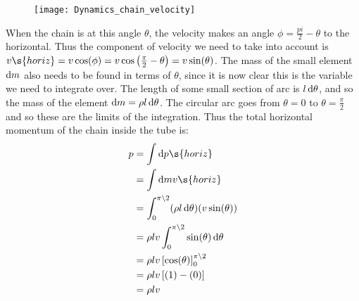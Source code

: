 \begin{hint}
{\begin{enumerate}
\begin{figure}[h]
\centering
\texttt{[image: Dynamics\_chain\_velocity]}
\caption{}
\label{fig:Dynamics_chain_velocity}
\end{figure}

When the chain is at this angle $\theta$, the velocity makes an angle $\phi = \frac{pi}{2} - \theta$ to the horizontal. Thus the component of velocity we need to take into account is $v\s{horiz} = v \cos(\phi) = v \cos\left(\frac{\pi}{2} - \theta\right) = v \sin(\theta)$. The mass of the small element $\operatorname{d}\! m$ also needs to be found in terms of $\theta$, since it is now clear this is the variable we need to integrate over. The length of some small section of arc is $l \operatorname{d}\! \theta$, and so the mass of the element $\operatorname{d}\! m = \rho l \operatorname{d}\!\theta$. The circular arc goes from $\theta = 0$ to $\theta =  \frac{\pi}{2}$ and so these are the limits of the integration. Thus the total horizontal momentum of the chain inside the tube is:
\begin{align*} p &= \int \d p\s{horiz} \\ &= \int \d m v\s{horiz} \\ &= \int_{0}^{\pi\backslash 2} (\rho l \d\theta)(v \sin(\theta)) \\ &= \rho l v \int_{0}^{\pi \backslash 2} \sin(\theta) \d\theta \\ &= \rho l v \left[ \cos(\theta)\right]_{0}^{\pi \backslash 2} \\ &= \rho l v \left[ (1) - (0) \right] \\ &= \rho l v \end{align*}



\end{enumerate}}
\end{hint}

